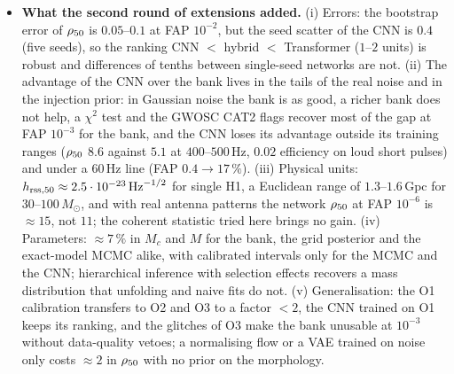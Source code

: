 \begin{itemize}[nosep]
\item \textbf{What the second round of extensions added.} (i) Errors: the bootstrap error of $\rho_{50}$ is $0.05$--$0.1$ at FAP $10^{-2}$, but the seed scatter of the CNN is $0.4$ (five seeds), so the ranking CNN $<$ hybrid $<$ Transformer ($1$--$2$ units) is robust and differences of tenths between single-seed networks are not. (ii) The advantage of the CNN over the bank lives in the tails of the real noise and in the injection prior: in Gaussian noise the bank is as good, a richer bank does not help, a $\chi^2$ test and the GWOSC CAT2 flags recover most of the gap at FAP $10^{-3}$ for the bank, and the CNN loses its advantage outside its training ranges ($\rho_{50}$ $8.6$ against $5.1$ at $400$--$500\,$Hz, $0.02$ efficiency on loud short pulses) and under a $60\,$Hz line (FAP $0.4\to17\,\%$). (iii) Physical units: $h_{\rm rss,50}\approx2.5\cdot10^{-23}\,\mathrm{Hz}^{-1/2}$ for single H1, a Euclidean range of $1.3$--$1.6\,$Gpc for $30$--$100\,M_\odot$, and with real antenna patterns the network $\rho_{50}$ at FAP $10^{-6}$ is $\approx15$, not $11$; the coherent statistic tried here brings no gain. (iv) Parameters: $\approx7\,\%$ in $M_c$ and $M$ for the bank, the grid posterior and the exact-model MCMC alike, with calibrated intervals only for the MCMC and the CNN; hierarchical inference with selection effects recovers a mass distribution that unfolding and naive fits do not. (v) Generalisation: the O1 calibration transfers to O2 and O3 to a factor $<2$, the CNN trained on O1 keeps its ranking, and the glitches of O3 make the bank unusable at $10^{-3}$ without data-quality vetoes; a normalising flow or a VAE trained on noise only costs $\approx2$ in $\rho_{50}$ with no prior on the morphology.
\end{itemize}

